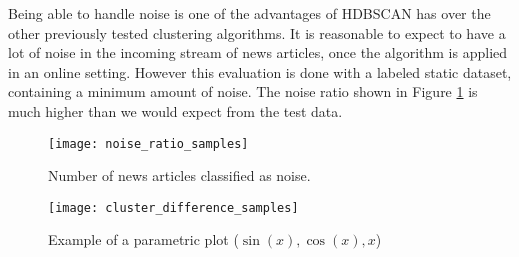 Being able to handle noise is one of the advantages of HDBSCAN has over the other previously tested clustering algorithms. It is reasonable to expect to have a lot of noise in the incoming stream of news articles, once the algorithm is applied in an online setting. However this evaluation is done with a labeled static dataset, containing a minimum amount of noise. The noise ratio shown in Figure \ref{fig:noise_ratio_samples} is much higher than we would expect from the test data. 

\begin{figure}[h]
    \centering
    \texttt{[image: noise\_ratio\_samples]}
    \caption{Number of news articles classified as noise.}
    \label{fig:noise_ratio_samples}
\end{figure}



\begin{figure}[h]
    \centering
    \texttt{[image: cluster\_difference\_samples]}
    \caption{Example of a parametric plot ($\sin (x), \cos(x), x$)}
    \label{fig:cluster_difference_samples}
\end{figure}